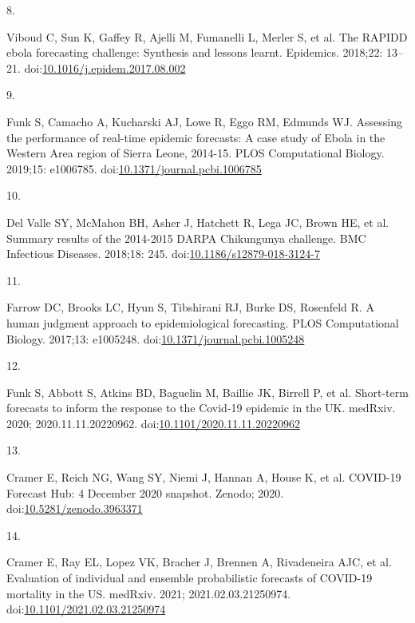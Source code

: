 \documentclass[10pt,letterpaper]{article}
\newlength{\cslhangindent}
\newlength{\csllabelwidth}
\newlength{\cslentryspacingunit} %
\newenvironment{CSLReferences}[2] %
 {%
  \setlength{\parindent}{0pt}
  \ifodd #1
  \let\oldpar\par
  \def\par{\hangindent=\cslhangindent\oldpar}
  \fi
  \setlength{\parskip}{#2\cslentryspacingunit}
 }%
 {}
\newcommand{\CSLLeftMargin}[1]{\parbox[t]{\csllabelwidth}{#1}}
\newcommand{\CSLRightInline}[1]{\parbox[t]{\linewidth - \csllabelwidth}{#1}\break}
\begin{document}
\begin{CSLReferences}{0}{0}
\leavevmode{}%
\CSLLeftMargin{8. }
\CSLRightInline{Viboud C, Sun K, Gaffey R, Ajelli M, Fumanelli L, Merler
S, et al. The {RAPIDD} ebola forecasting challenge: {Synthesis} and
lessons learnt. Epidemics. 2018;22: 13--21.
doi:\href{https://doi.org/10.1016/j.epidem.2017.08.002}{10.1016/j.epidem.2017.08.002}}

\leavevmode{}%
\CSLLeftMargin{9. }
\CSLRightInline{Funk S, Camacho A, Kucharski AJ, Lowe R, Eggo RM,
Edmunds WJ. Assessing the performance of real-time epidemic forecasts:
{A} case study of {Ebola} in the {Western Area} region of {Sierra
Leone}, 2014-15. PLOS Computational Biology. 2019;15: e1006785.
doi:\href{https://doi.org/10.1371/journal.pcbi.1006785}{10.1371/journal.pcbi.1006785}}

\leavevmode{}%
\CSLLeftMargin{10. }
\CSLRightInline{Del Valle SY, McMahon BH, Asher J, Hatchett R, Lega JC,
Brown HE, et al. Summary results of the 2014-2015 {DARPA Chikungunya}
challenge. BMC Infectious Diseases. 2018;18: 245.
doi:\href{https://doi.org/10.1186/s12879-018-3124-7}{10.1186/s12879-018-3124-7}}

\leavevmode{}%
\CSLLeftMargin{11. }
\CSLRightInline{Farrow DC, Brooks LC, Hyun S, Tibshirani RJ, Burke DS,
Rosenfeld R. A human judgment approach to epidemiological forecasting.
PLOS Computational Biology. 2017;13: e1005248.
doi:\href{https://doi.org/10.1371/journal.pcbi.1005248}{10.1371/journal.pcbi.1005248}}

\leavevmode{}%
\CSLLeftMargin{12. }
\CSLRightInline{Funk S, Abbott S, Atkins BD, Baguelin M, Baillie JK,
Birrell P, et al. Short-term forecasts to inform the response to the
{Covid-19} epidemic in the {UK}. medRxiv. 2020; 2020.11.11.20220962.
doi:\href{https://doi.org/10.1101/2020.11.11.20220962}{10.1101/2020.11.11.20220962}}

\leavevmode{}%
\CSLLeftMargin{13. }
\CSLRightInline{Cramer E, Reich NG, Wang SY, Niemi J, Hannan A, House K,
et al. {COVID-19 Forecast Hub}: 4 {December} 2020 snapshot. {Zenodo};
2020.
doi:\href{https://doi.org/10.5281/zenodo.3963371}{10.5281/zenodo.3963371}}

\leavevmode{}%
\CSLLeftMargin{14. }
\CSLRightInline{Cramer E, Ray EL, Lopez VK, Bracher J, Brennen A,
Rivadeneira AJC, et al. Evaluation of individual and ensemble
probabilistic forecasts of {COVID-19} mortality in the {US}. medRxiv.
2021; 2021.02.03.21250974.
doi:\href{https://doi.org/10.1101/2021.02.03.21250974}{10.1101/2021.02.03.21250974}}


\end{CSLReferences}
\end{document}
